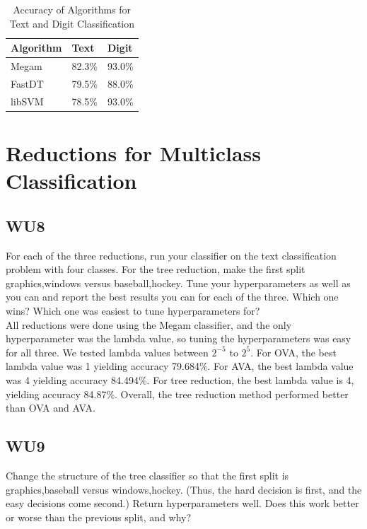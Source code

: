 \documentclass[a4paper,11pt]{article}
\begin{document}
\begin{table}[!ht]
\begin{center}
    \begin{tabular}{ | l | l | l |} \hline
    Algorithm & Text   & Digit \\ \hline
    Megam     & 82.3\% & 93.0\% \\ \hline
    FastDT    & 79.5\% & 88.0\% \\ \hline
    libSVM    & 78.5\% & 93.0\% \\ \hline
    \end{tabular}
    \caption{Accuracy of Algorithms for Text and Digit Classification}
    \label{tables:WU7}
\end{center}
\end{table}

\pagebreak
\section{Reductions for Multiclass Classification}
\subsection{WU8}
\textsf{For each of the three reductions, run your classifier on the
text classification problem with four classes. For the tree reduction, 
make the first split {graphics,windows} versus {baseball,hockey}. 
Tune your hyperparameters as well as you can and report the best 
results you can for each of the three. Which one wins? Which one was 
easiest to tune hyperparameters for?}\\

All reductions were done using the Megam classifier, 
and the only hyperparameter was the lambda value,
so tuning the hyperparameters was easy for all three.
We tested lambda values between $2^{-5}$ to $2^{5}$.
For OVA, the best lambda value was 1 yielding accuracy 79.684\%. 
For AVA, the best lambda value was 4 yielding accuracy 84.494\%. 
For tree reduction, the best lambda value is 4, yielding accuracy 84.87\%.
Overall, the tree reduction method performed better than OVA and AVA.

\subsection{WU9}
\textsf{Change the structure of the tree classifier so that the first
  split is {graphics,baseball} versus {windows,hockey}. (Thus, the
  hard decision is first, and the easy decisions come second.) Return
  hyperparameters well. Does this work better or worse than the
  previous split, and why?}\\
\end{document}
